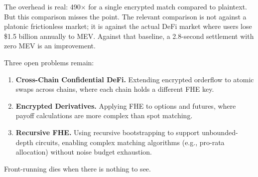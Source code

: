 \documentclass[11pt,letterpaper]{article}
\theoremstyle{definition}
\theoremstyle{remark}
\newcommand{\FHE}{\textsc{FHE}}
\newcommand{\MEV}{\textsc{MEV}}
\begin{document}
The overhead is real: 490$\times$ for a single encrypted match compared to plaintext. But this comparison misses the point. The relevant comparison is not against a platonic frictionless market; it is against the actual DeFi market where users lose \$1.5 billion annually to \MEV{}. Against that baseline, a 2.8-second settlement with zero \MEV{} is an improvement.

Three open problems remain:

\begin{enumerate}
    \item \textbf{Cross-Chain Confidential DeFi.} Extending encrypted orderflow to atomic swaps across chains, where each chain holds a different \FHE{} key.
    \item \textbf{Encrypted Derivatives.} Applying \FHE{} to options and futures, where payoff calculations are more complex than spot matching.
    \item \textbf{Recursive FHE.} Using recursive bootstrapping to support unbounded-depth circuits, enabling complex matching algorithms (e.g., pro-rata allocation) without noise budget exhaustion.
\end{enumerate}

Front-running dies when there is nothing to see.
\end{document}
